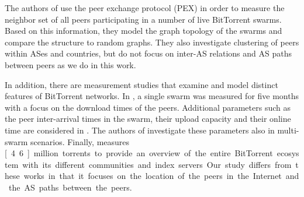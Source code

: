 The authors of \cite{Kryczka2011} use the peer exchange protocol (PEX) in order to measure the neighbor set of all peers participating in a number of live BitTorrent swarms. Based on this information, they model the graph topology of the swarms and compare the structure to random graphs. They also investigate clustering of peers within ASes and countries, but do not focus on inter-AS relations and AS paths between peers as we do in this work.

In addition, there are measurement studies that examine and model distinct features of BitTorrent networks. In \cite{Izal2004}, a single swarm was measured for five months with a focus on the download times of the peers. Additional parameters such as the peer inter-arrival times in the swarm, their upload capacity and their online time are considered in \cite{Pouwelse2005}. The authors of \cite{Guo2005} investigate these parameters also in multi-swarm scenarios. Finally, \cite{Zhang2010} measures \unit[4.6]{million} torrents to provide an overview of the entire BitTorrent ecosystem with its different communities and index servers. Our study differs from these works in that it focuses on the location of the peers in the Internet and the AS paths between the peers.

